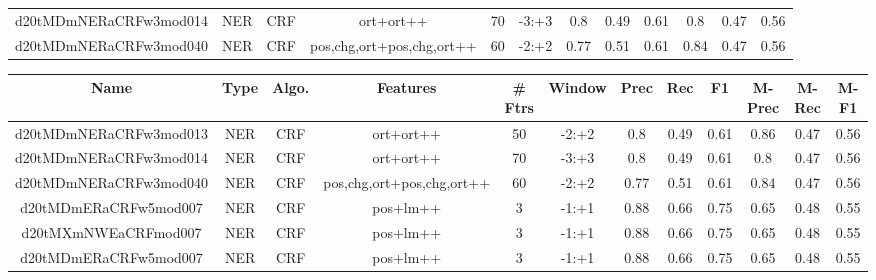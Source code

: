 \documentclass[a4paper]{article}
\begin{document}
\begin{landscape}
\begin{center}
\begin{tabular}{ |c|c|c|c|c|c|c|c|c|c|c|c|}
 
 	
 	\small{ d20tMDmNERaCRFw3mod014 } & \small{ NER} & \small{  CRF }  & ort+ort++  &  70 &  \small{  -3:+3 }  &  0.8 & 0.49 & 0.61  &  0.8 & 0.47 & 0.56 \\
 	

 
 	
 	\small{ d20tMDmNERaCRFw3mod040 } & \small{ NER} & \small{  CRF }  & pos,chg,ort+pos,chg,ort++  &  60 &  \small{  -2:+2 }  &  0.77 & 0.51 & 0.61  &  0.84 & 0.47 & 0.56 \\
 	
 \hline
\end{tabular}
\end{center}




\begin{center}
\begin{tabular}{ |c|c|c|c|c|c|c|c|c|c|c|c|} 
 \hline
 	Name & Type & Algo. & Features & \# Ftrs & Window & Prec & Rec & F1 & M-Prec & M-Rec & M-F1\\
 \hline

 	

 
 	
 	\small{ d20tMDmNERaCRFw3mod013 } & \small{ NER} & \small{  CRF }  & ort+ort++  &  50 &  \small{  -2:+2 }  &  0.8 & 0.49 & 0.61  &  0.86 & 0.47 & 0.56 \\
 	

 
 	
 	\small{ d20tMDmNERaCRFw3mod014 } & \small{ NER} & \small{  CRF }  & ort+ort++  &  70 &  \small{  -3:+3 }  &  0.8 & 0.49 & 0.61  &  0.8 & 0.47 & 0.56 \\
 	

 
 	
 	\small{ d20tMDmNERaCRFw3mod040 } & \small{ NER} & \small{  CRF }  & pos,chg,ort+pos,chg,ort++  &  60 &  \small{  -2:+2 }  &  0.77 & 0.51 & 0.61  &  0.84 & 0.47 & 0.56 \\
 	

 
 	
 	\small{ d20tMDmERaCRFw5mod007 } & \small{ NER} & \small{  CRF }  & pos+lm++  &  3 &  \small{  -1:+1 }  &  0.88 & 0.66 & 0.75  &  0.65 & 0.48 & 0.55 \\
 	

 
 	
 	\small{ d20tMXmNWEaCRFmod007 } & \small{ NER} & \small{  CRF }  & pos+lm++  &  3 &  \small{  -1:+1 }  &  0.88 & 0.66 & 0.75  &  0.65 & 0.48 & 0.55 \\
 	

 
 	
 	\small{ d20tMDmERaCRFw5mod007 } & \small{ NER} & \small{  CRF }  & pos+lm++  &  3 &  \small{  -1:+1 }  &  0.88 & 0.66 & 0.75  &  0.65 & 0.48 & 0.55 \\
 	


\end{tabular}
\end{center}
\end{landscape}
\end{document}
